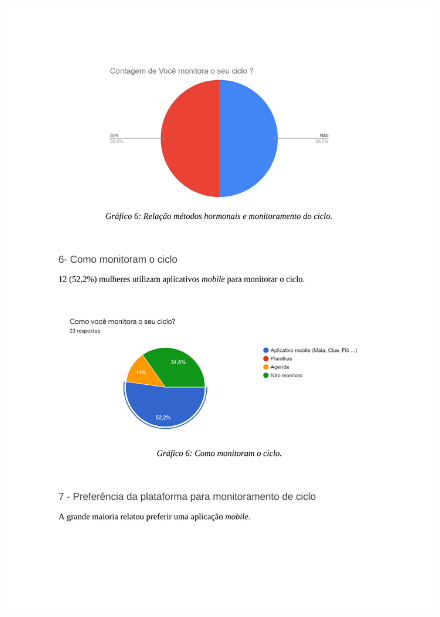 \begin{apendicesenv}
        \begin{figure}[ht]
            \centering
            \includegraphics[keepaspectratio=true,scale=0.7]{figuras/Tab5.pdf}
        \end{figure}
        

\end{apendicesenv}
